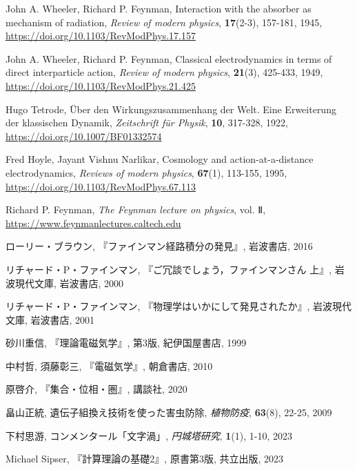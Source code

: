 \documentclass[10pt, a5paper, twoside]{jsarticle}
\theoremstyle{definition}
\begin{document}
\begin{thebibliography}{99}
		 John A. Wheeler, Richard P. Feynman, Interaction with the absorber as mechanism of radiation, \textit{Review of modern physics}, \textbf{17}(2-3), 157-181, 1945, \url{https://doi.org/10.1103/RevModPhys.17.157}

		 John A. Wheeler, Richard P. Feynman, Classical electrodynamics in terms of direct interparticle action, \textit{Review of modern physics}, \textbf{21}(3), 425-433, 1949, \url{https://doi.org/10.1103/RevModPhys.21.425}

		 Hugo Tetrode, Über den Wirkungszusammenhang der Welt. Eine Erweiterung der klassischen Dynamik, \textit{Zeitschrift für Physik}, \textbf{10}, 317-328, 1922, \url{https://doi.org/10.1007/BF01332574}

		 Fred Hoyle, Jayant Vishnu Narlikar, Cosmology and action-at-a-distance electrodynamics, \textit{Reviews of modern physics}, \textbf{67}(1), 113-155, 1995, \url{https://doi.org/10.1103/RevModPhys.67.113}

		 Richard P. Feynman, \textit{The Feynman lecture on physics}, vol. Ⅱ, \url{https://www.feynmanlectures.caltech.edu}

		 ローリー・ブラウン, 『ファインマン経路積分の発見』, 岩波書店, 2016

		 リチャード・P・ファインマン, 『ご冗談でしょう，ファインマンさん 上』, 岩波現代文庫, 岩波書店, 2000

		 リチャード・P・ファインマン, 『物理学はいかにして発見されたか』, 岩波現代文庫, 岩波書店, 2001

		 砂川重信, 『理論電磁気学』, 第3版, 紀伊国屋書店, 1999
		
		 中村哲, 須藤彰三, 『電磁気学』, 朝倉書店, 2010

		 原啓介, 『集合・位相・圏』, 講談社, 2020

		 畠山正統, 遺伝子組換え技術を使った害虫防除, \textit{植物防疫}, \textbf{63}(8), 22-25, 2009

		 下村思游, コンメンタール「文字渦」, \textit{円城塔研究}, \textbf{1}(1), 1-10, 2023

		 Michael Sipser, 『計算理論の基礎2』, 原書第3版, 共立出版, 2023

	\end{thebibliography}
\end{document}
